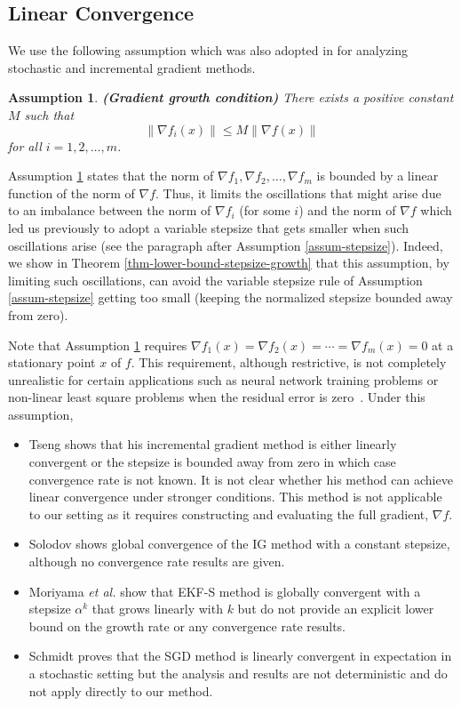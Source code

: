 \documentclass[final,numbook]{svjour3}
\newtheorem{assumption}[property]{Assumption}
\begin{document}
\subsection{Linear Convergence} 
 \label{sec-linear-conv}
We use the following assumption which was also adopted in \cite{TsengIncrGradient98,Solodov98IncrGrad,AlgEkfs2003,schmidt2013fast} for analyzing stochastic and incremental gradient methods. 
\begin{assumption}\label{assum-gradfi} \textbf{(Gradient growth condition)} There exists a positive constant $M$ such that $$\|{{\nabla f_i}}(x)\| \leq M \|\nabla f(x)\|$$ for all $i=1,2,\dots,m$. 
\end{assumption}
Assumption \ref{assum-gradfi} states that the norm of $ \nabla f_1,\nabla f_2,\dots, \nabla f_m $ is bounded by a linear function of the norm of $\nabla f$. Thus, it limits the oscillations that might arise due to an imbalance between the norm of $\nabla f_i$ (for some $i$) and the norm of $\nabla f$ which led us previously to adopt a variable stepsize that gets smaller when such oscillations arise (see the paragraph after Assumption \ref{assum-stepsize}). Indeed, we show in Theorem \ref{thm-lower-bound-stepsize-growth} that this assumption, by limiting such oscillations, can avoid the variable stepsize rule of Assumption \ref{assum-stepsize} getting too small (keeping the normalized stepsize bounded away from zero).

Note that Assumption \ref{assum-gradfi} requires $\nabla f_1(x) = \nabla f_2(x) = \cdots = \nabla f_m(x) = 0$ at a stationary point $x$ of $f$. This requirement, although restrictive, is not completely unrealistic for certain applications such as neural network training problems or non-linear least square problems when the residual error is zero~\cite{TsengIncrGradient98,schmidt2013fast}. Under this assumption,
 
\begin{itemize}
  \item Tseng \cite{TsengIncrGradient98} shows that his incremental gradient method is either linearly convergent or the stepsize is bounded away from zero in which case convergence rate is not known. It is not clear whether his method can achieve linear convergence under stronger conditions. This method is not applicable to our setting as it requires constructing and evaluating the full gradient, $\nabla f$.
  \item Solodov \cite{Solodov98IncrGrad} shows global convergence of the IG method with a constant stepsize, although no convergence rate results are given.
  \item Moriyama \textit{et al.} \cite{AlgEkfs2003} show that EKF-S method is globally convergent with a stepsize $\alpha^k$ that grows linearly with $k$ but do not provide an explicit lower bound on the growth rate or any convergence rate results.   
  \item Schmidt \cite{schmidt2013fast} proves that the SGD method is linearly convergent in expectation in a stochastic setting but the analysis and results are not deterministic and do not apply directly to our method.  
\end{itemize} 
\end{document}
